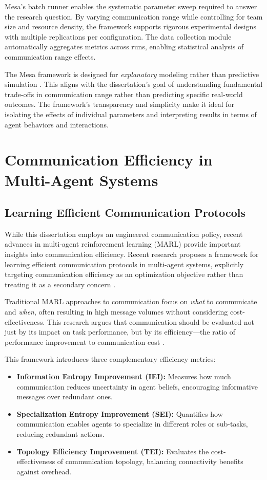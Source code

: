 Mesa's batch runner enables the systematic parameter sweep required to answer the research question. By varying communication range while controlling for team size and resource density, the framework supports rigorous experimental designs with multiple replications per configuration. The data collection module automatically aggregates metrics across runs, enabling statistical analysis of communication range effects.

The Mesa framework is designed for \emph{explanatory} modeling rather than predictive simulation \citep{kazil2020}. This aligns with the dissertation's goal of understanding fundamental trade-offs in communication range rather than predicting specific real-world outcomes. The framework's transparency and simplicity make it ideal for isolating the effects of individual parameters and interpreting results in terms of agent behaviors and interactions.

\section{Communication Efficiency in Multi-Agent Systems}

\subsection{Learning Efficient Communication Protocols}

While this dissertation employs an engineered communication policy, recent advances in multi-agent reinforcement learning (MARL) provide important insights into communication efficiency. Recent research proposes a framework for learning efficient communication protocols in multi-agent systems, explicitly targeting communication efficiency as an optimization objective rather than treating it as a secondary concern \citep{zhang2024}.

Traditional MARL approaches to communication focus on \emph{what} to communicate and \emph{when}, often resulting in high message volumes without considering cost-effectiveness. This research argues that communication should be evaluated not just by its impact on task performance, but by its efficiency—the ratio of performance improvement to communication cost \citep{zhang2024}.

This framework introduces three complementary efficiency metrics:

\begin{itemize}
    \item \textbf{Information Entropy Improvement (IEI):} Measures how much communication reduces uncertainty in agent beliefs, encouraging informative messages over redundant ones.

    \item \textbf{Specialization Entropy Improvement (SEI):} Quantifies how communication enables agents to specialize in different roles or sub-tasks, reducing redundant actions.

    \item \textbf{Topology Efficiency Improvement (TEI):} Evaluates the cost-effectiveness of communication topology, balancing connectivity benefits against overhead.
\end{itemize}

